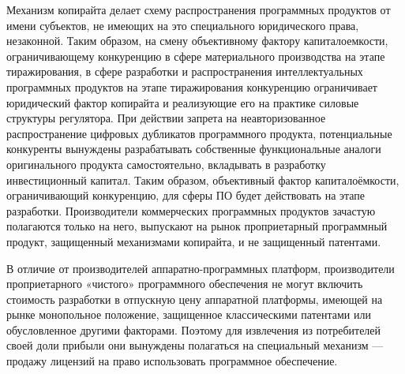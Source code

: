 \documentclass{article}
\begin{document}
Механизм копирайта делает схему распространения программных продуктов от имени субъектов, не имеющих на это специального юридического права, незаконной. Таким образом, на смену объективному фактору капиталоемкости, ограничивающему конкуренцию в сфере материального производства на этапе тиражирования, в сфере разработки и распространения интеллектуальных программных продуктов на этапе тиражирования конкуренцию ограничивает юридический фактор копирайта и реализующие его на практике силовые структуры регулятора. При действии запрета на неавторизованное распространение цифровых дубликатов программного продукта, потенциальные конкуренты вынуждены разрабатывать собственные функциональные аналоги оригинального продукта самостоятельно, вкладывать в разработку инвестиционный капитал. Таким образом, объективный фактор капиталоёмкости, ограничивающий конкуренцию, для сферы ПО будет действовать на этапе разработки. Производители коммерческих программных продуктов зачастую полагаются только на него, выпускают на рынок проприетарный программный продукт, защищенный механизмами копирайта, и не защищенный патентами.

В отличие от производителей аппаратно-программных платформ, производители проприетарного «чистого» программного обеспечения не могут включить стоимость разработки в отпускную цену аппаратной платформы, имеющей на рынке монопольное положение, защищенное классическими патентами или обусловленное другими факторами. Поэтому для извлечения из потребителей своей доли прибыли они вынуждены полагаться на специальный механизм — продажу лицензий на право использовать программное обеспечение.
\end{document}
